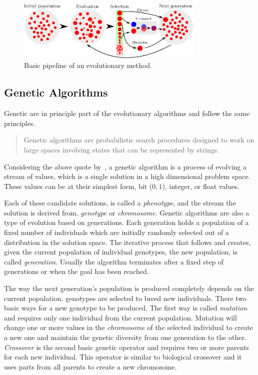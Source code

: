 \begin{figure}[t!]
\centering
\includegraphics[width=0.8\textwidth]{../Figures/Misc/Evolution.eps}
\caption{Basic pipeline of an evolutionary method.}
\label{fig:evolutionPipeline}
\end{figure}

\subsection{Genetic Algorithms}
Genetic are in principle part of the evolutionary algorithms and follow the same principles.

\begin{quote}Genetic algorithms are probabilistic search procedures designed to work on
large spaces involving states that can be represented by strings.\end{quote}

Considering the above quote by~\cite{goldberg1988genetic}, a genetic algorithm is a process of evolving a stream of values, which is a single solution in a high dimensional problem space. These values can be at their simplest form, bit ($0, 1$), integer, or float values. 

Each of these candidate solutions, is called a \emph{phenotype}, and the stream the solution is derived from, \emph{genotype} or \emph{chromosome}. Genetic algorithms are also a type of evolution based on generations. Each generation holds a population of a fixed number of individuals which are initially randomly selected out of a distribution in the solution space. The iterative process that follows and creates, given the current population of individual genotypes, the new population, is called \emph{generation}. Usually the algorithm terminates after a fixed step of generations or when the goal has been reached. 

The way the next generation's population is produced completely depends on the current population, genotypes are selected to breed new individuals. There two basic ways for a new genotype to be produced. The first way is called \emph{mutation} and requires only one individual from the current population. Mutation will change one or more values in the \emph{chromosome} of the selected individual to create a new one and maintain the genetic diversity from one generation to the other. \emph{Crossover} is the second basic genetic operator and requires two or more parents for each new individual. This operator is similar to biological crossover and it uses parts from all parents to create a new chromosome.

